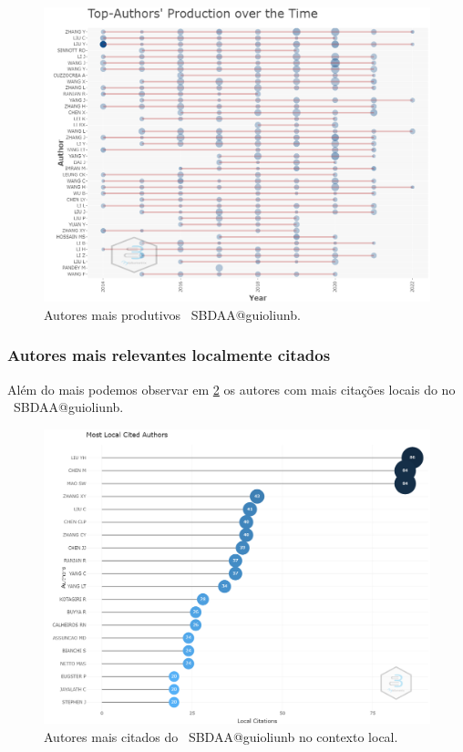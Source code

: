 \begin{figure}
    \centering
    \includegraphics[width=1\textwidth]{experiments/guioliunb/AnaliseBibliometrica/SocialBigDataAnalysis/PRODUCTION OVER THE TIME.png}
    \caption{Autores mais produtivos \dataset\ SBDAA@guioliunb.}
    \label{fig:authors:production}
\end{figure}



\subsubsection{Autores mais relevantes localmente citados}

Além do mais podemos observar em \ref{fig:authors:production} os autores com mais citações locais do no \dataset\ SBDAA@guioliunb.

\begin{figure}
    \centering
    \includegraphics[width=1\textwidth]{experiments/guioliunb/AnaliseBibliometrica/SocialBigDataAnalysis/MOST LOAL CITED AUTHORS.png}
    \caption{Autores mais citados do \dataset\ SBDAA@guioliunb no contexto local.}
    \label{fig:authors:production}
\end{figure}


